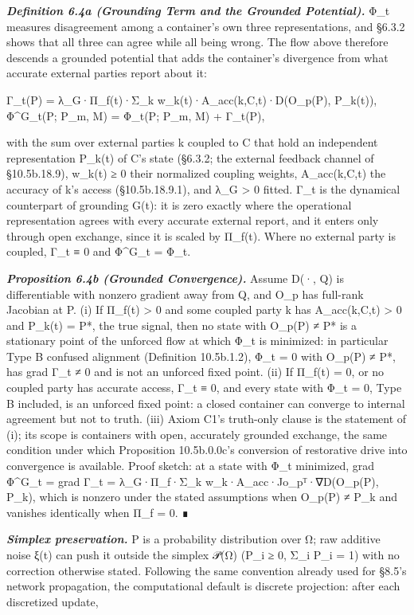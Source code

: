 \documentclass[
]{article}
\begin{document}
\emph{\textbf{Definition 6.4a (Grounding Term and the Grounded
Potential).}} Φ\_t measures disagreement among a container's own three
representations, and §6.3.2 shows that all three can agree while all
being wrong. The flow above therefore descends a grounded potential that
adds the container's divergence from what accurate external parties
report about it:

Γ\_t(P) = λ\_G·Π\_f(t)·Σ\_k w\_k(t)·A\_acc(k,C,t)·D(O\_p(P), P\_k(t)),
Φ\^{}G\_t(P; P\_m, M) = Φ\_t(P; P\_m, M) + Γ\_t(P),

with the sum over external parties k coupled to C that hold an
independent representation P\_k(t) of C's state (§6.3.2; the external
feedback channel of §10.5b.18.9), w\_k(t) ≥ 0 their normalized coupling
weights, A\_acc(k,C,t) the accuracy of k's access (§10.5b.18.9.1), and
λ\_G \textgreater{} 0 fitted. Γ\_t is the dynamical counterpart of
grounding G(t): it is zero exactly where the operational representation
agrees with every accurate external report, and it enters only through
open exchange, since it is scaled by Π\_f(t). Where no external party is
coupled, Γ\_t ≡ 0 and Φ\^{}G\_t = Φ\_t.

\emph{\textbf{Proposition 6.4b (Grounded Convergence).}} Assume D(·, Q)
is differentiable with nonzero gradient away from Q, and O\_p has
full-rank Jacobian at P. (i) If Π\_f(t) \textgreater{} 0 and some
coupled party k has A\_acc(k,C,t) \textgreater{} 0 and P\_k(t) = P*, the
true signal, then no state with O\_p(P) ≠ P* is a stationary point of
the unforced flow at which Φ\_t is minimized: in particular Type B
confused alignment (Definition 10.5b.1.2), Φ\_t = 0 with O\_p(P) ≠ P*,
has grad Γ\_t ≠ 0 and is not an unforced fixed point. (ii) If Π\_f(t) =
0, or no coupled party has accurate access, Γ\_t ≡ 0, and every state
with Φ\_t = 0, Type B included, is an unforced fixed point: a closed
container can converge to internal agreement but not to truth. (iii)
Axiom C1's truth-only clause is the statement of (i); its scope is
containers with open, accurately grounded exchange, the same condition
under which Proposition 10.5b.0.0c's conversion of restorative drive
into convergence is available. Proof sketch: at a state with Φ\_t
minimized, grad Φ\^{}G\_t = grad Γ\_t = λ\_G·Π\_f·Σ\_k
w\_k·A\_acc·Jo\_pᵀ·∇D(O\_p(P), P\_k), which is nonzero under the stated
assumptions when O\_p(P) ≠ P\_k and vanishes identically when Π\_f = 0.
∎

\emph{\textbf{Simplex preservation.}} P is a probability distribution
over Ω; raw additive noise ξ(t) can push it outside the simplex 𝒫(Ω)
(P\_i ≥ 0, Σ\_i P\_i = 1) with no correction otherwise stated. Following
the same convention already used for §8.5's network propagation, the
computational default is discrete projection: after each discretized
update,
\end{document}
